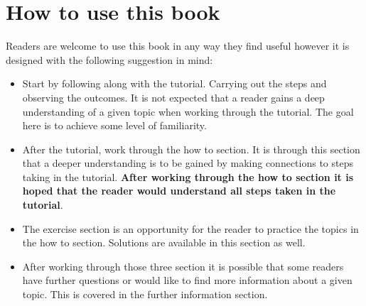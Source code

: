 \section{How to use this book}
Readers are welcome to use this book in any way they find useful however it is
designed with the following suggestion in mind:
\begin{itemize}
\item Start by following along with the tutorial. Carrying out the steps and
observing the outcomes. It is not expected that a reader gains a deep
understanding of a given topic when working through the tutorial. The goal
here is to achieve some level of familiarity.

\item After the tutorial, work through the how to section. It is through this
section that a deeper understanding is to be gained by making connections to
steps taking in the tutorial. \textbf{After working through the how to section it is
hoped that the reader would understand all steps taken in the tutorial}.

\item The exercise section is an opportunity for the reader to practice the topics
in the how to section. Solutions are available in this section as well.

\item After working through those three section it is possible that some readers
have further questions or would like to find more information about a
given topic. This is covered in the further information section.

\end{itemize}

